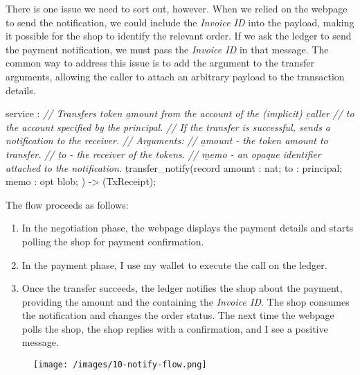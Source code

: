 \documentclass{article}
\begin{document}
There is one issue we need to sort out, however.
When we relied on the webpage to send the notification, we could include the \emph{Invoice ID} into the payload, making it possible for the shop to identify the relevant order.
If we ask the ledger to send the payment notification, we must pass the \emph{Invoice ID} in that message.
The common way to address this issue is to add the  argument to the transfer arguments, allowing the caller to attach an arbitrary payload to the transaction details.

\begin{code}[candid]
service : {
  \emph{// Transfers token \b{amount} from the account of the (implicit) \b{caller}}
  \emph{// to the account specified by the principal.}
  \emph{// If the transfer is successful, sends a notification to the receiver.}
  \emph{// Arguments:}
  \emph{//   \b{amount} - the token amount to transfer.}
  \emph{//   \b{to} - the receiver of the tokens.}
  \emph{//   \b{memo} - an opaque identifier attached to the notification.}
  \b{transfer_notify}(record {
    amount : nat;
    to : principal;
    memo : opt blob;
  }) -> (TxReceipt);
}
\end{code}

The flow proceeds as follows:
\begin{enumerate}
  \item In the negotiation phase, the webpage displays the payment details and starts polling the shop for payment confirmation.
  \item In the payment phase, I use my wallet to execute the  call on the ledger.
  \item
    Once the transfer succeeds, the ledger notifies the shop about the payment, providing the amount and the  containing the \emph{Invoice ID}.
    The shop consumes the notification and changes the order status.
    The next time the webpage polls the shop, the shop replies with a confirmation, and I see a positive message.
\end{enumerate}

\begin{figure}[grayscale-diagram]
\texttt{[image: /images/10-notify-flow.png]}
\end{figure}
\end{document}
